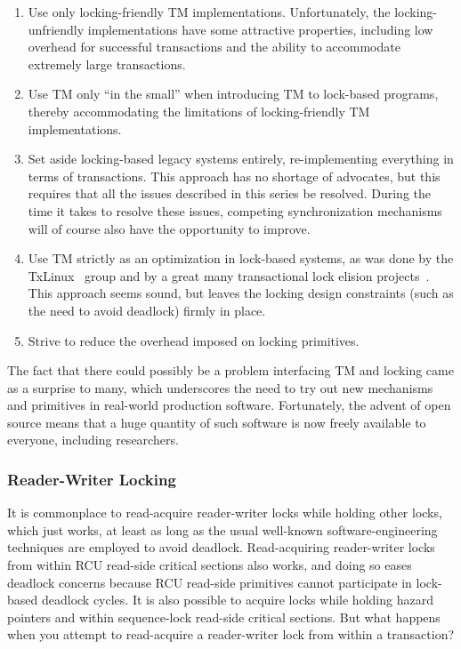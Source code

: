 \begin{enumerate}
\item	Use only locking-friendly TM implementations.
	Unfortunately, the locking-unfriendly implementations have some
	attractive properties, including low overhead for successful
	transactions and the ability to accommodate extremely large
	transactions.
\item	Use TM only ``in the small'' when introducing TM to lock-based
	programs, thereby accommodating the limitations of
	locking-friendly TM implementations.
\item	Set aside locking-based legacy systems entirely, re-implementing
	everything in terms of transactions.
	This approach has no shortage of advocates, but this requires
	that all the issues described in this series be resolved.
	During the time it takes to resolve these issues, competing
	synchronization mechanisms will of course also have the
	opportunity to improve.
\item	Use TM strictly as an optimization in lock-based systems, as was
	done by the TxLinux~\cite{ChistopherJRossbach2007a} group and
	by a great many transactional lock elision
	projects~\cite{MartinPohlack2011HTM2TLE,Kleen:2014:SEL:2566590.2576793,PascalFelber2016rwlockElision,SeongJaePark2020HTMRCUlock}.
	This approach seems sound, but leaves the locking design
	constraints (such as the need to avoid deadlock) firmly in place.
\item	Strive to reduce the overhead imposed on locking primitives.
\end{enumerate}

The fact that there could possibly be a problem interfacing TM and locking
came as a surprise to many, which underscores the need to try out new
mechanisms and primitives in real-world production software.
Fortunately, the advent of open source means that a huge quantity of
such software is now freely available to everyone, including researchers.

\subsubsection{Reader-Writer Locking}
\label{sec:future:Reader-Writer Locking}

It is commonplace to read-acquire reader-writer locks while holding
other locks, which just works, at least as long as the usual well-known
software-engineering techniques are employed to avoid deadlock.
Read-acquiring reader-writer locks from within RCU read-side critical
sections also works, and doing so eases deadlock concerns because RCU
read-side primitives cannot participate in lock-based deadlock cycles.
It is also possible to acquire locks while holding hazard pointers and
within sequence-lock read-side critical sections.
But what happens when you attempt to read-acquire a reader-writer lock
from within a transaction?

